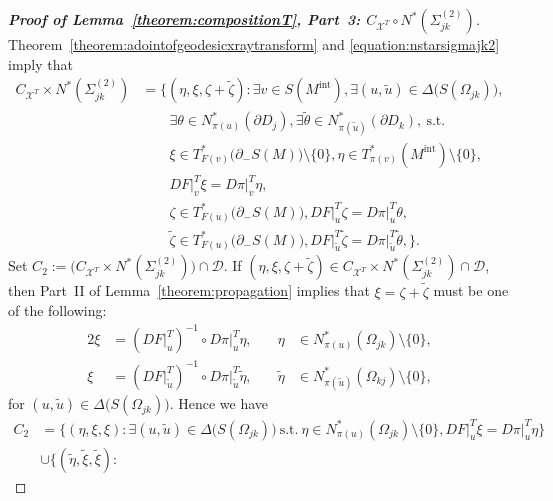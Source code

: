 \documentclass[a4paper,11pt,reqno]{amsart}
\numberwithin{equation}{section}
\theoremstyle{definition}
\theoremstyle{remark}
\begin{document}
\begin{proof}[{\bf Proof of Lemma~\ref{theorem:compositionT}, Part~3: $C_{\mathcal{X}^T}{\circ}N^\ast(\Sigma_{jk}^{(2)})$}]
Theorem~\ref{theorem:adointofgeodesicxraytransform} and \eqref{equation:nstarsigmajk2} imply that  
%
%
\begin{align*}
  C_{\mathcal{X}^T}{\times}N^\ast(\Sigma_{jk}^{(2)})
& =  
  \bigl\{
  (\eta,\xi,\zeta+\tilde{\zeta}): 
  \exists v \in S(M^\text{int}), 
  \exists (u,\tilde{u}) \in \Delta\bigl(S(\Omega_{jk})\bigr), 
\\
& \qquad
  \exists \theta \in N^\ast_{\pi(u)}(\partial{D_j}), 
  \exists \tilde{\theta} \in N^\ast_{\pi(\tilde{u})}(\partial{D_k}), 
  \ \text{s.t.}\ 
\\
& \qquad
  \xi \in T^\ast_{F(v)}\bigl(\partial_-S(M)\bigr)\setminus\{0\}, 
  \eta \in T^\ast_{\pi(v)}(M^\text{int})\setminus\{0\}, 
\\
& \qquad
  DF\vert^T_v\xi=D\pi\vert^T_v\eta,
\\
& \qquad
  \zeta \in T^\ast_{F(u)}\bigl(\partial_-S(M)\bigr), 
  DF\vert^T_u\zeta=D\pi\vert^T_u\theta,
\\
& \qquad
  \tilde{\zeta} \in T^\ast_{F(u)}\bigl(\partial_-S(M)\bigr), 
  DF\vert^T_{\tilde{u}}\tilde{\zeta}=D\pi\vert^T_{\tilde{u}}\tilde{\theta},  
  \bigr\}. 
\end{align*}
%
%
Set $C_2:=\bigl(C_{\mathcal{X}^T}{\times}N^\ast(\Sigma_{jk}^{(2)})\bigr)\cap\mathcal{D}$. 
If $(\eta,\xi,\zeta+\tilde{\zeta}) \in C_{\mathcal{X}^T}{\times}N^\ast(\Sigma_{jk}^{(2)}){\cap}\mathcal{D}$, 
then Part~II of Lemma~\ref{theorem:propagation} implies that $\xi=\zeta+\tilde{\zeta}$ must be one of the following: 
%
%
\begin{alignat*}{2}
  \xi
& =
  (DF\vert^T_u)^{-1}{\circ}D\pi\vert^T_u\eta, 
& \quad
  \eta
& \in
  N^\ast_{\pi(u)}(\Omega_{jk})\setminus\{0\},
\\
  \xi
& =
  (DF\vert^T_{\tilde{u}})^{-1}{\circ}D\pi\vert^T_{\tilde{u}}\tilde{\eta}, 
& \quad
  \tilde{\eta}
& \in
  N^\ast_{\pi(\tilde{u})}(\Omega_{kj})\setminus\{0\},
\end{alignat*}  
%
%
for $(u,\tilde{u}) \in \Delta\bigl(S(\Omega_{jk})\bigr)$. 
Hence we have 
%
%
\begin{align*}
  C_2
& =
  \bigl\{
  (\eta,\xi,\xi):
  \exists (u,\tilde{u}) \in \Delta\bigl(S(\Omega_{jk})\bigr)
  \ \text{s.t.}\  
  \eta \in N^\ast_{\pi(u)}(\Omega_{jk})\setminus\{0\},  
  DF\vert^T_u\xi=D\pi\vert^T_u\eta
  \bigr\}
\\
& \cup
  \bigl\{
  (\tilde{\eta},\tilde{\xi},\tilde{\xi}):

\end{align*}
\end{proof}
\end{document}
